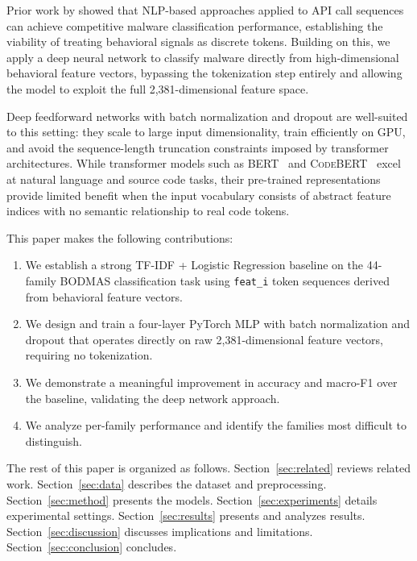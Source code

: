 \documentclass[11pt]{article}
\begin{document}
Prior work by \citet{tran2017nlp} showed that NLP-based approaches applied
to API call sequences can achieve competitive malware classification
performance, establishing the viability of treating behavioral signals as
discrete tokens. Building on this, we apply a deep neural network to
classify malware directly from high-dimensional behavioral feature vectors,
bypassing the tokenization step entirely and allowing the model to exploit
the full 2,381-dimensional feature space.

Deep feedforward networks with batch normalization and dropout are
well-suited to this setting: they scale to large input dimensionality,
train efficiently on GPU, and avoid the sequence-length truncation
constraints imposed by transformer architectures. While transformer models
such as \textsc{BERT}~\citep{devlin-etal-2019-bert} and
\textsc{CodeBERT}~\citep{feng-etal-2020-codebert} excel at natural language
and source code tasks, their pre-trained representations provide limited
benefit when the input vocabulary consists of abstract feature indices with
no semantic relationship to real code tokens.

This paper makes the following contributions:
\begin{enumerate}
  \item We establish a strong TF-IDF + Logistic Regression baseline on
        the 44-family BODMAS classification task using \texttt{feat\_i}
        token sequences derived from behavioral feature vectors.
  \item We design and train a four-layer PyTorch MLP with batch normalization
        and dropout that operates directly on raw 2,381-dimensional feature
        vectors, requiring no tokenization.
  \item We demonstrate a meaningful improvement in accuracy and macro-F1
        over the baseline, validating the deep network approach.
  \item We analyze per-family performance and identify the families
        most difficult to distinguish.
\end{enumerate}

The rest of this paper is organized as follows.
Section~\ref{sec:related} reviews related work.
Section~\ref{sec:data} describes the dataset and preprocessing.
Section~\ref{sec:method} presents the models.
Section~\ref{sec:experiments} details experimental settings.
Section~\ref{sec:results} presents and analyzes results.
Section~\ref{sec:discussion} discusses implications and limitations.
Section~\ref{sec:conclusion} concludes.
\end{document}
